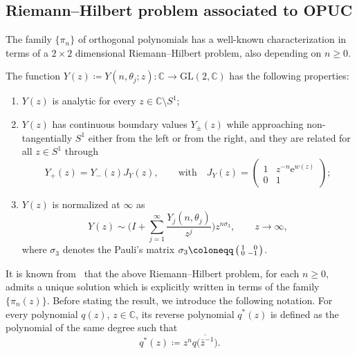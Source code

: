 \documentclass[pdftex]{sigma}%
\numberwithin{equation}{section}
\def\e{\mathrm{e}}
\begin{document}
	\subsection{Riemann--Hilbert problem associated to OPUC}
	The family $\{\pi_n\}$ of orthogonal polynomials has a well-known characterization in terms of a $2 \times 2$ dimensional Riemann--Hilbert problem, also depending on $n \geq 0$.
	\begin{problem}\label{RH1}
		The function $Y(z)\coloneqq Y(n,\theta_j;z)\colon\mathbb{C} \rightarrow \mathrm{GL}(2,\mathbb{C})$ has the following properties:
		\begin{enumerate}\itemsep=0pt
			\item[(1)] $Y(z)$ is analytic for every $z\in \mathbb{C}\setminus S^1$;
			\item[(2)] $Y(z)$ has continuous boundary values $Y_{\pm}(z)$ while approaching non-tangentially $S^1$ either from the left or from the right, and they are related for all $z\in S^1$ through
			\begin{equation*}
				Y_+(z)=Y_-(z)J_Y(z),\qquad \text{with}\quad J_Y(z)=\begin{pmatrix}
					1 &z^{-n}\e^{w(z)}\\
					0&1
				\end{pmatrix}\!;
			\end{equation*}
			\item[(3)] $Y(z)$ is normalized at $\infty$ as
			\begin{equation*}
				Y(z) \sim \Bigg(I+\sum_{j=1}^{\infty} \frac{Y_j(n,\theta_j)}{z^j}\Bigg)z^{n\sigma_3},\qquad z \rightarrow \infty,
			\end{equation*}
			where $\sigma_3$ denotes the Pauli's matrix $\sigma_3\coloneqq \left(\begin{smallmatrix}
				1&\hphantom{-} 0\\0&-1
			\end{smallmatrix}\right)$.
		\end{enumerate}	
	\end{problem}
	It is known from~\cite{baik1999distribution} that the above Riemann--Hilbert problem, for each $n\geq 0$, admits a unique solution which is explicitly written in terms of the family $\lbrace\pi_n(z)\rbrace$. Before stating the result, we introduce the following notation. For every polynomial $q(z)$, $z\in \mathbb{C}$, its reverse polynomial $q^*(z)$ is defined as the polynomial of the same degree such that
	\begin{equation*}
		q^*(z)\coloneqq z^n\overline{q\big(\bar{z}^{-1}\big)}.
	\end{equation*}
\end{document}
